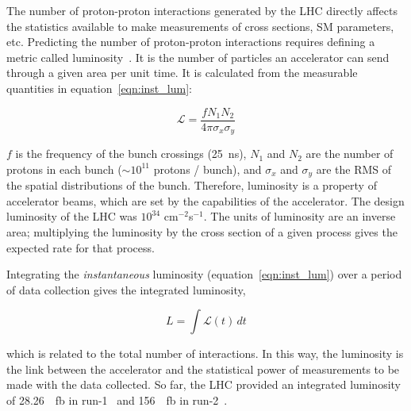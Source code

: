 The number of proton-proton interactions generated by the LHC directly affects the statistics available to make measurements of cross sections, SM parameters, etc. 
Predicting the number of proton-proton interactions requires defining a metric called luminosity~\cite{zyla_review_2020}. It is the number of particles an accelerator can send through a given area per unit time. It is calculated from the measurable quantities in equation~\ref{eqn:inst_lum}:

\begin{equation}
\mathcal{L} = \frac{f N_{1} N_{2} }{4 \pi \sigma_{x} \sigma_{y}}
\label{eqn:inst_lum}
\end{equation}

$f$ is the frequency of the bunch crossings (\SI{25}{\nano\second}), $N_{1}$ and $N_{2}$ are the number of protons in each bunch ($\sim 10^{11}$ protons / bunch), and $\sigma_{x}$ and $\sigma_{y}$ are the RMS of the spatial distributions of the bunch. Therefore, luminosity is a property of accelerator beams, which are set by the capabilities of the accelerator. The design luminosity of the LHC was $10^{34}$ cm$^{-2}$s$^{-1}$. The units of luminosity are an inverse area; multiplying the luminosity by the cross section of a given process gives the expected rate for that process.

Integrating the \textit{instantaneous} luminosity (equation~\ref{eqn:inst_lum}) over a period of data collection gives the integrated luminosity,

\begin{equation}
L = \int \mathcal{L} \left( t \right) \,dt
\label{eqn:int_lum}
\end{equation}

which is related to the total number of interactions. In this way, the luminosity is the link between the accelerator and the statistical power of measurements to be made with the data collected. So far, the LHC provided an integrated luminosity of \SI{28.26}{\per\femto\barn} in run-1~\cite{atlas_luminosity_run1} and \SI{156}{\per\femto\barn} in run-2~\cite{atlas_luminosity_run2}.


